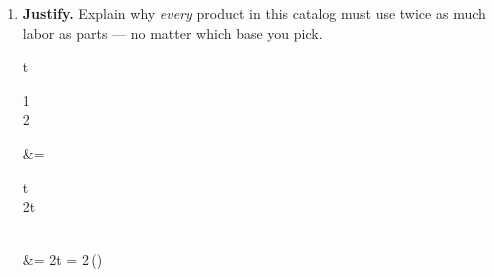 \documentclass[10pt]{article}
\begin{document}
\begin{tcolorbox}[colback=white, colframe=black!40, title=\textbf{Tier E --- Extension},
    fonttitle=\bfseries, arc=1.5mm, left=3mm, right=3mm, top=2mm, bottom=2mm, breakable]
\begin{enumerate}[leftmargin=1.7em, itemsep=8pt]
\begin{work}
\end{work}
  \item \textbf{Justify.} Explain why \emph{every} product in this catalog must use twice as much
        labor as parts --- no matter which base you pick.
\begin{work}
  t\begin{bsmallmatrix} 1\\2 \end{bsmallmatrix} &= \begin{bsmallmatrix} t\\2t \end{bsmallmatrix} \\
   &= 2t = 2\,()
\end{work}
        \writeline
\end{enumerate}
\end{tcolorbox}
\end{document}
